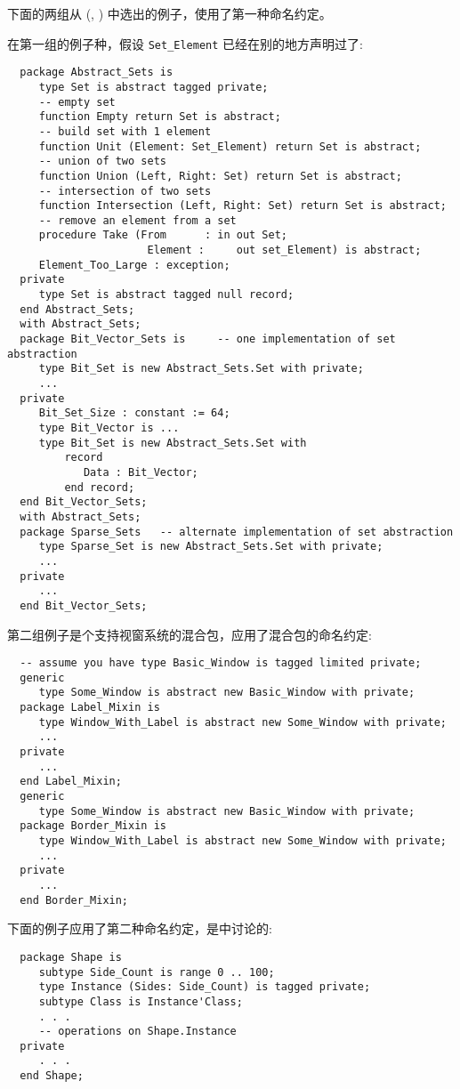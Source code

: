 \begin{blockindent}
下面的两组从\cite{rational95} (, )
中选出的例子，使用了第一种命名约定。

在第一组的例子种，假设 \texttt{Set\_Element} 已经在别的地方声明过了:
\begin{lstlisting}
  package Abstract_Sets is
     type Set is abstract tagged private;
     -- empty set
     function Empty return Set is abstract;
     -- build set with 1 element
     function Unit (Element: Set_Element) return Set is abstract;
     -- union of two sets
     function Union (Left, Right: Set) return Set is abstract;
     -- intersection of two sets
     function Intersection (Left, Right: Set) return Set is abstract;
     -- remove an element from a set
     procedure Take (From      : in out Set;
                      Element :     out set_Element) is abstract;
     Element_Too_Large : exception;
  private
     type Set is abstract tagged null record;
  end Abstract_Sets;
  with Abstract_Sets;
  package Bit_Vector_Sets is     -- one implementation of set abstraction
     type Bit_Set is new Abstract_Sets.Set with private;
     ...
  private
     Bit_Set_Size : constant := 64;
     type Bit_Vector is ...
     type Bit_Set is new Abstract_Sets.Set with
         record
            Data : Bit_Vector;
         end record;
  end Bit_Vector_Sets;
  with Abstract_Sets;
  package Sparse_Sets   -- alternate implementation of set abstraction
     type Sparse_Set is new Abstract_Sets.Set with private;
     ...
  private
     ...
  end Bit_Vector_Sets;
\end{lstlisting}

第二组例子是个支持视窗系统的混合包，应用了混合包的命名约定:
\begin{lstlisting}
  -- assume you have type Basic_Window is tagged limited private;
  generic
     type Some_Window is abstract new Basic_Window with private;
  package Label_Mixin is
     type Window_With_Label is abstract new Some_Window with private;
     ...
  private
     ...
  end Label_Mixin;
  generic
     type Some_Window is abstract new Basic_Window with private;
  package Border_Mixin is
     type Window_With_Label is abstract new Some_Window with private;
     ...
  private
     ...
  end Border_Mixin;
\end{lstlisting}

下面的例子应用了第二种命名约定，是\cite{rosen95}中讨论的:
\begin{lstlisting}
  package Shape is
     subtype Side_Count is range 0 .. 100;
     type Instance (Sides: Side_Count) is tagged private;
     subtype Class is Instance'Class;
     . . .
     -- operations on Shape.Instance
  private
     . . .
  end Shape;


\end{lstlisting}
\end{blockindent}
